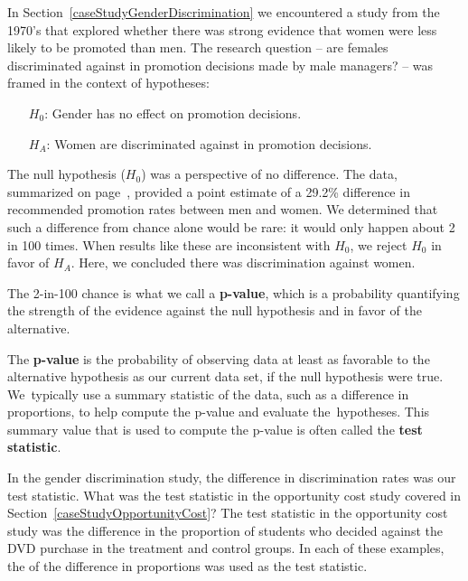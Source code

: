In Section~\ref{caseStudyGenderDiscrimination} we encountered a study from the 1970's that explored whether there was strong evidence that women were less likely to be promoted than men. The research question -- are females discriminated against in promotion decisions made by male managers? -- was framed in the context of hypotheses:
\begin{itemize}
\setlength{\itemsep}{0mm}
\item[$H_0$:] Gender has no effect on promotion decisions.
\item[$H_A$:] Women are discriminated against in promotion decisions.
\end{itemize}
The null hypothesis ($H_0$) was a perspective of no difference. The data, summarized on page~\pageref{discriminationResults}, provided a point estimate of a 29.2\% difference in recommended promotion rates between men and women. We determined that such a difference from chance alone would be rare: it would only happen about 2 in 100 times. When results like these are inconsistent with $H_0$, we reject $H_0$ in favor of $H_A$. Here, we concluded there was discrimination against women.

The 2-in-100 chance is what we call a \textbf{p-value}, which is a probability quantifying the strength of the evidence against the null hypothesis and in favor of the alternative. %

\begin{termBox}{
The \textbf{p-value} is the probability of observing data at least as favorable to the alternative hypothesis as our current data set, if the null hypothesis were true. We~typically use a summary statistic of the data, such as a difference in proportions, to help compute the p-value and evaluate the~hypotheses. This summary value that is used to compute the p-value is often called the \textbf{test statistic}.}
\end{termBox}

\textA{\pagebreak}

\begin{example}{In the gender discrimination study, the difference in discrimination rates was our test statistic. What was the test statistic in the opportunity cost study covered in Section~\ref{caseStudyOpportunityCost}?}
The test statistic in the opportunity cost study was the difference in the proportion of students who decided against the DVD purchase in the treatment and control groups. In each of these examples, the  of the difference in proportions was used as the test statistic.
\end{example}

